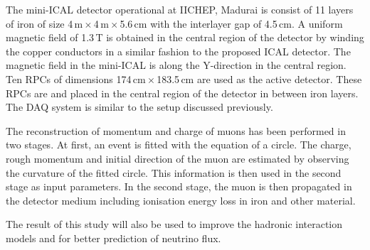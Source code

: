 The mini-ICAL detector operational at IICHEP, Madurai is consist of 11
layers of iron of size 4\,m\,$\times$\,4\,m\,$\times$\,5.6\,cm with
the interlayer gap of 4.5\,cm. A uniform magnetic field of 1.3\,T is
obtained in the central region of the detector by winding the copper
conductors in a similar fashion to the proposed ICAL detector. The
magnetic field in the mini-ICAL is along the Y-direction in the
central region. Ten RPCs of dimensions 174\,cm\,$\times$\,183.5\,cm
are used as the active detector. These RPCs are and placed in the
central region of the detector in between iron layers. The DAQ system
is similar to the setup discussed previously.

The reconstruction of momentum and charge of muons has been performed
in two stages. At first, an event is fitted with the equation of a
circle. The charge, rough momentum and initial direction of the muon
are estimated by observing the curvature of the fitted circle. This
information is then used in the second stage as input parameters. In
the second stage, the muon is then propagated in the detector medium
including ionisation energy loss in iron and other material.

The result of this study will also be used to improve the hadronic
interaction models and for better prediction of neutrino flux.
